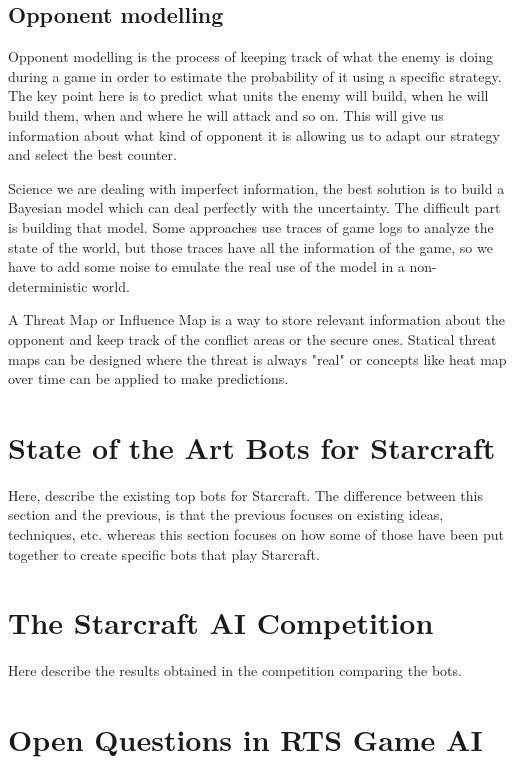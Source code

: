 \documentclass[journal]{IEEEtran}
\begin{document}
\subsection{Opponent modelling}
{\color{ForestGreen}
Opponent modelling is the process of keeping track of what the enemy is doing during a game in order to estimate the probability of it using a specific strategy. The key point here is to predict what units the enemy will build, when he will build them, when and where he will attack and so on. This will give us information about what kind of opponent it is allowing us to adapt our strategy and select the best counter.

Science we are dealing with imperfect information, the best solution is to build a Bayesian model which can deal perfectly with the uncertainty. The difficult part is building that model. Some approaches use traces of game logs to analyze the state of the world, but those traces have all the information of the game, so we have to add some noise to emulate the real use of the model in a non-deterministic world.

A Threat Map or Influence Map is a way to store relevant information about the opponent and keep track of the conflict areas or the secure ones. Statical threat maps can be designed where the threat is always "real" or concepts like heat map over time can be applied to make predictions.
}


\section{State of the Art Bots for Starcraft}\label{sec:bot}

{\color{blue}
Here, describe the existing top bots for Starcraft. The difference between this section and the previous, is that the previous focuses on existing ideas, techniques, etc. whereas this section focuses on how some of those have been put together to create specific bots that play Starcraft.
}


\section{The Starcraft AI Competition}\label{sec:competition}

{\color{blue}
Here describe the results obtained in the competition comparing the bots.
}


\section{Open Questions in RTS Game AI}\label{sec:questions}
\end{document}
